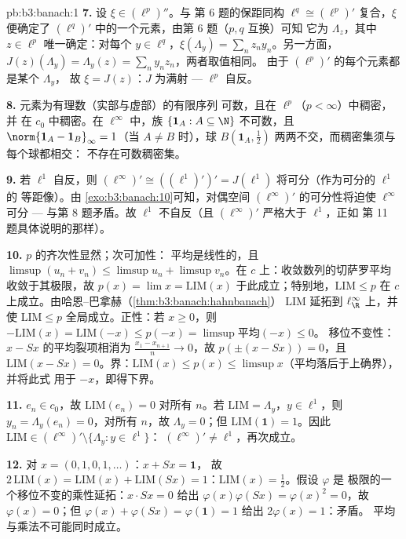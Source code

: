 \begin{solution}{pb:b3:banach:1}
\textbf{7.} 设 $\xi \in (\ell^p)''$。与
第 6 题的保距同构 $\ell^q \cong (\ell^p)'$ 复合，$\xi$ 便确定了
$(\ell^q)'$ 中的一个元素，由第 6 题（$p, q$ 互换）可知
它为 $\Lambda_z$，其中 $z \in \ell^p$ 唯一确定：对每个
$y \in \ell^q$，$\xi(\Lambda_y) = \sum_nz_ny_n$。另一方面，
$J(z)(\Lambda_y) = \Lambda_y(z) = \sum_ny_nz_n$，两者取值相同。
由于 $(\ell^p)'$ 的每个元素都是某个 $\Lambda_y$，
故 $\xi = J(z)$：$J$ 为满射 --- $\ell^p$ 自反。

\textbf{8.} 元素为有理数（实部与虚部）的有限序列
可数，且在 $\ell^p$（$p < \infty$）中稠密，并
在 $c_0$ 中稠密。在 $\ell^\infty$ 中，族 $\{\mathbf 1_A : A
\subseteq \N\}$ 不可数，且 $\norm{\mathbf 1_A -
\mathbf 1_B}_\infty = 1$（当 $A \neq B$ 时），球 $B(\mathbf
1_A, \frac12)$ 两两不交，而稠密集须与每个球都相交：
不存在可数稠密集。

\textbf{9.} 若 $\ell^1$ 自反，则 $(\ell^\infty)'
\cong ((\ell^1)')' = J(\ell^1)$ 将可分（作为可分的 $\ell^1$ 的
等距像）。由
\cref{exo:b3:banach:10}可知，对偶空间
$(\ell^\infty)'$ 的可分性将迫使 $\ell^\infty$ 可分 ---
与第 8 题矛盾。故 $\ell^1$ 不自反（且
$(\ell^\infty)'$ 严格大于 $\ell^1$，正如
第 11 题具体说明的那样）。

\textbf{10.} $p$ 的齐次性显然；次可加性：
平均是线性的，且 $\limsup(u_n + v_n) \leq \limsup u_n +
\limsup v_n$。在 $c$ 上：收敛数列的切萨罗平均
收敛于其极限，故 $p(x) = \lim x =
\mathrm{LIM}(x)$ 于此成立；特别地，$\mathrm{LIM} \leq p$ 在
$c$ 上成立。由哈恩–巴拿赫（\cref{thm:b3:banach:hahnbanach}）
$\mathrm{LIM}$ 延拓到 $\ell^\infty_\R$ 上，并使 $\mathrm{LIM} \leq p$
全局成立。正性：若 $x \geq 0$，则 $-\mathrm{LIM}(x) =
\mathrm{LIM}(-x) \leq p(-x) = \limsup\text{平均}(-x) \leq 0$。
移位不变性：$x - Sx$ 的平均裂项相消为
$\frac{x_1 - x_{n+1}}n \to 0$，故 $p(\pm(x - Sx)) = 0$，且
$\mathrm{LIM}(x - Sx) = 0$。界：$\mathrm{LIM}(x) \leq p(x)
\leq \limsup x$（平均落后于上确界），并将此式
用于 $-x$，即得下界。

\textbf{11.} $e_n \in c_0$，故 $\mathrm{LIM}(e_n) = 0$
对所有 $n$。若 $\mathrm{LIM} = \Lambda_y$，$y \in \ell^1$，则
$y_n = \Lambda_y(e_n) = 0$，对所有 $n$，故 $\Lambda_y = 0$；但
$\mathrm{LIM}(\mathbf 1) = 1$。因此 $\mathrm{LIM} \in
(\ell^\infty)' \setminus \{\Lambda_y : y \in \ell^1\}$：
$(\ell^\infty)' \neq \ell^1$，再次成立。

\textbf{12.} 对 $x = (0,1,0,1,\dots)$：$x + Sx = \mathbf 1$，
故 $2\,\mathrm{LIM}(x) = \mathrm{LIM}(x) + \mathrm{LIM}(Sx) =
1$：$\mathrm{LIM}(x) = \frac12$。假设 $\varphi$ 是
极限的一个移位不变的乘性延拓：$x\cdot
Sx = 0$ 给出 $\varphi(x)\varphi(Sx) = \varphi(x)^2 = 0$，故
$\varphi(x) = 0$；但 $\varphi(x) + \varphi(Sx) =
\varphi(\mathbf 1) = 1$ 给出 $2\varphi(x) = 1$：矛盾。
平均与乘法不可能同时成立。


\end{solution}
